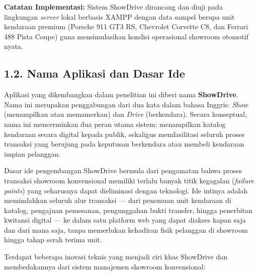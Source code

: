\documentclass[11pt, a5paper]{article}
\begin{document}
\begin{infobox}
\textbf{Catatan Implementasi:} Sistem ShowDrive dirancang dan diuji pada
lingkungan \textit{server} lokal berbasis XAMPP dengan data sampel berupa unit
kendaraan premium (Porsche 911 GT3 RS, Chevrolet Corvette C8, dan Ferrari 488
Pista Coupe) guna mensimulasikan kondisi operasional showroom otomotif nyata.
\end{infobox}

\subsection*{1.2. Nama Aplikasi dan Dasar Ide}

Aplikasi yang dikembangkan dalam penelitian ini diberi nama \textbf{ShowDrive}.
Nama ini merupakan penggabungan dari dua kata dalam bahasa Inggris: \textit{Show}
(menampilkan atau memamerkan) dan \textit{Drive} (berkendara). Secara konseptual,
nama ini mencerminkan dua peran utama sistem: menampilkan katalog kendaraan secara
digital kepada publik, sekaligus memfasilitasi seluruh proses transaksi yang
berujung pada keputusan berkendara atau membeli kendaraan impian pelanggan.

Dasar ide pengembangan ShowDrive bermula dari pengamatan bahwa proses transaksi
showroom konvensional memiliki terlalu banyak titik kegagalan (\textit{failure
points}) yang seharusnya dapat dieliminasi dengan teknologi. Ide intinya adalah
memindahkan seluruh alur transaksi — dari penemuan unit kendaraan di katalog,
pengajuan pemesanan, pengunggahan bukti transfer, hingga penerbitan kwitansi
digital — ke dalam satu platform web yang dapat diakses kapan saja dan dari mana
saja, tanpa memerlukan kehadiran fisik pelanggan di showroom hingga tahap serah
terima unit.

Terdapat beberapa inovasi teknis yang menjadi ciri khas ShowDrive dan
membedakannya dari sistem manajemen showroom konvensional:
\end{document}
